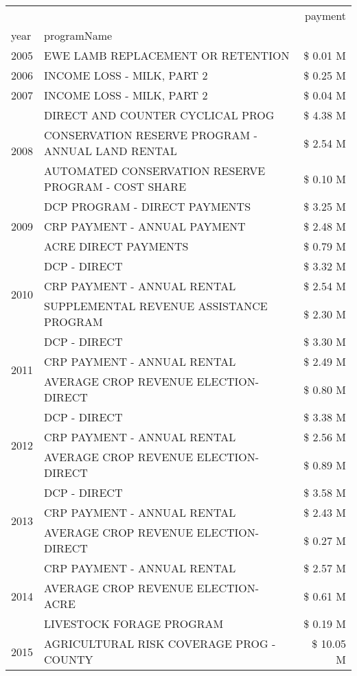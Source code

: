 \begin{tabular}{llr}
\toprule
 &  & payment \\
year & programName &  \\
\midrule
2005 & EWE LAMB REPLACEMENT OR RETENTION & \$ 0.01 M \\
\cline{1-3}
2006 & INCOME LOSS - MILK, PART 2 & \$ 0.25 M \\
\cline{1-3}
2007 & INCOME LOSS - MILK, PART 2 & \$ 0.04 M \\
\cline{1-3}
\multirow[t]{3}{*}{2008} & DIRECT AND COUNTER CYCLICAL PROG & \$ 4.38 M \\
 & CONSERVATION RESERVE PROGRAM - ANNUAL LAND RENTAL & \$ 2.54 M \\
 & AUTOMATED CONSERVATION RESERVE PROGRAM - COST SHARE & \$ 0.10 M \\
\cline{1-3}
\multirow[t]{3}{*}{2009} & DCP PROGRAM - DIRECT PAYMENTS & \$ 3.25 M \\
 & CRP PAYMENT - ANNUAL PAYMENT & \$ 2.48 M \\
 & ACRE DIRECT PAYMENTS & \$ 0.79 M \\
\cline{1-3}
\multirow[t]{3}{*}{2010} & DCP - DIRECT & \$ 3.32 M \\
 & CRP PAYMENT - ANNUAL RENTAL & \$ 2.54 M \\
 & SUPPLEMENTAL REVENUE ASSISTANCE PROGRAM & \$ 2.30 M \\
\cline{1-3}
\multirow[t]{3}{*}{2011} & DCP - DIRECT & \$ 3.30 M \\
 & CRP PAYMENT - ANNUAL RENTAL & \$ 2.49 M \\
 & AVERAGE CROP REVENUE ELECTION-DIRECT & \$ 0.80 M \\
\cline{1-3}
\multirow[t]{3}{*}{2012} & DCP - DIRECT & \$ 3.38 M \\
 & CRP PAYMENT - ANNUAL RENTAL & \$ 2.56 M \\
 & AVERAGE CROP REVENUE ELECTION-DIRECT & \$ 0.89 M \\
\cline{1-3}
\multirow[t]{3}{*}{2013} & DCP - DIRECT & \$ 3.58 M \\
 & CRP PAYMENT - ANNUAL RENTAL & \$ 2.43 M \\
 & AVERAGE CROP REVENUE ELECTION-DIRECT & \$ 0.27 M \\
\cline{1-3}
\multirow[t]{3}{*}{2014} & CRP PAYMENT - ANNUAL RENTAL & \$ 2.57 M \\
 & AVERAGE CROP REVENUE ELECTION-ACRE & \$ 0.61 M \\
 & LIVESTOCK FORAGE PROGRAM & \$ 0.19 M \\
\cline{1-3}
\multirow[t]{3}{*}{2015} & AGRICULTURAL RISK COVERAGE PROG - COUNTY & \$ 10.05 M \\

\end{tabular}
